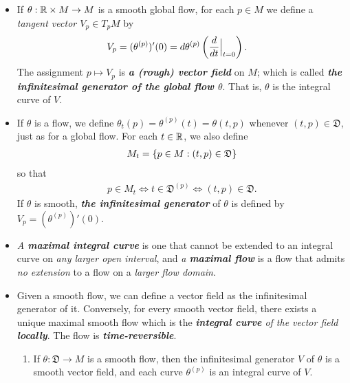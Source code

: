 \documentclass[11pt]{article}
\begin{document}
\begin{itemize}
\item \begin{definition}
If $\theta: {\mathbb R} \times M \rightarrow M$ is a smooth global flow, for each $p \in M$ we define a \emph{tangent vector $V_p \in T_pM$} by
\begin{align*}
V_p &=  (\theta^{(p)})'(0) = d\theta^{(p)}\left(\frac{d}{dt}\Bigr|_{t=0}\right).
\end{align*} 
The assignment $p \mapsto V_p$ is \emph{\textbf{a (rough) vector field}} on $M$; which is called \emph{\textbf{the infinitesimal generator of the global flow $\theta$}}. That is, $\theta$ is the integral curve of $V$.
\end{definition}

\item \begin{definition}
If $\theta$ is a flow, we define $\theta_t(p) = \theta^{(p)}(t) = \theta(t, p)$ whenever $(t, p) \in \mathfrak{D}$, just as for a global flow. For each $t \in {\mathbb R}$, we also define
\begin{align}
M_t = \left\{p \in M: (t, p) \in \mathfrak{D}\right\} \label{eqn: local_flow_starting_points}
\end{align} so that
\begin{align*}
p \in M_t \Leftrightarrow t \in \mathfrak{D}^{(p)} \Leftrightarrow (t,p) \in \mathfrak{D}.
\end{align*} If $\theta$ is smooth, \emph{\textbf{the infinitesimal generator}} of $\theta$ is defined by $V_p =  (\theta^{(p)})'(0)$.
\end{definition}

\item \begin{definition}
\emph{A \textbf{maximal integral curve}} is one that cannot be extended to an integral curve on \emph{any larger open interval}, and \emph{a \textbf{maximal flow}} is a flow that admits \emph{no extension} to a flow on a \emph{larger flow domain}.
\end{definition}

\item \begin{remark}
Given a smooth flow, we can define a vector field as the infinitesimal generator of it. Conversely, for every smooth vector field, there exists a unique maximal smooth flow which is the \emph{\textbf{integral curve} of the vector field} \emph{\textbf{locally}}. The flow is \emph{\textbf{time-reversible}}.
\begin{enumerate}
\item \begin{proposition}
If $\theta: \mathfrak{D} \rightarrow M$ is a smooth flow, then the infinitesimal generator $V$ of $\theta$ is a smooth vector field, and each curve $\theta^{(p)}$ is an integral curve of $V$.
\end{proposition}


\end{enumerate}
\end{remark}
\end{itemize}
\end{document}
